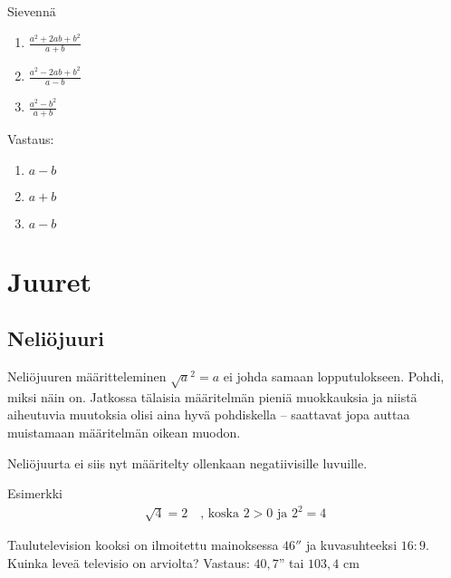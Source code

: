 \begin{tehtava}
Sievennä
\begin{enumerate}
\item $\frac{a^2+2ab+b^2}{a+b}$
\item $\frac{a^2-2ab+b^2}{a-b}$
\item $\frac{a^2-b^2}{a+b}$
\end{enumerate}
\begin{vastaus}
Vastaus:
\begin{enumerate}
\item $a-b$
\item $a+b$
\item $a-b$
\end{enumerate}
\end{vastaus}
\end{tehtava}

\chapter{Juuret}

\section{Neliöjuuri}


Neliöjuuren määritteleminen $\sqrt{a}^2=a$ ei johda samaan lopputulokseen. Pohdi, miksi näin on.
Jatkossa tälaisia määritelmän pieniä muokkauksia ja niistä aiheutuvia muutoksia olisi aina hyvä pohdiskella -- saattavat jopa auttaa muistamaan määritelmän oikean muodon.

Neliöjuurta ei siis nyt määritelty ollenkaan negatiivisille luvuille.


Esimerkki
\begin{align*}
\sqrt{4} = 2\quad \textrm{, koska $2>0$ ja $2^2 =4$} 
\end{align*}

Taulutelevision kooksi on ilmoitettu mainoksessa $46''$ ja kuvasuhteeksi $16:9$. Kuinka leveä televisio on arviolta?
Vastaus: $40,7$'' tai $103,4$ cm

